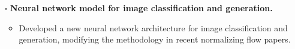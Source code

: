 \documentclass{simplecv}
\begin{document}
\begin{itemize}
  \item[$\square$] {\bf Neural network model for image classification and generation.} 
  \begin{itemize}
    \item Developed a new neural network architecture for image classification and generation, modifying the methodology in recent normalizing flow papers.


\end{itemize}
\end{itemize}
\end{document}
